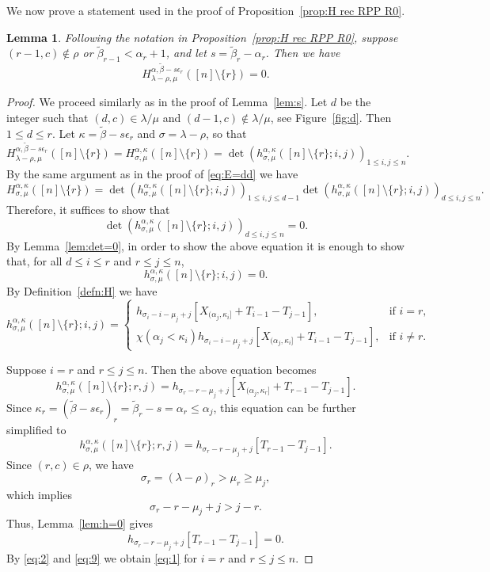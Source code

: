 \documentclass[12pt]{amsart}
\numberwithin{equation}{section}
\newtheorem{lem}[thm]{Lemma}
\theoremstyle{definition}
\newcommand\wb{\widetilde{\beta}}
\newcommand\lm{{\lambda/\mu}}
\begin{document}
We now prove a statement used in the proof of Proposition~\ref{prop:H rec RPP
  R0}.

\begin{lem}\label{lem:ss}
  Following the notation in Proposition~\ref{prop:H rec RPP R0}, suppose
  $(r-1,c)\notin\rho$ or $\wb_{r-1}<\alpha_r+1$, and let $s=\wb_r-\alpha_r$.
  Then we have
  \begin{equation}\label{eq:h0}
H^{\alpha,\wb-s\epsilon_r}_{\lambda-\rho,\mu}([n]\setminus\{r\})= 0.
  \end{equation}
\end{lem}
\begin{proof}
  We proceed similarly as in the proof of Lemma~\ref{lem:s}. Let $d$ be the
  integer such that $(d,c)\in\lm$ and $(d-1,c)\notin\lm$, see
  Figure~\ref{fig:d}. Then $1\le d\le r$. Let $\kappa=\wb-s\epsilon_r$ and
  $\sigma =\lambda-\rho$, so that
\[
H^{\alpha,\wb-s\epsilon_r}_{\lambda-\rho,\mu}([n]\setminus\{r\})
  = H_{\sigma,\mu}^{\alpha,\kappa}([n]\setminus\{r\})
=  \det(h_{\sigma,\mu}^{\alpha,\kappa}([n]\setminus\{r\};i,j))_{1\le i,j\le n}.
\]
By the same argument as in the proof of \eqref{eq:E=dd} we have
\[
  H_{\sigma,\mu}^{\alpha,\kappa}([n]\setminus\{r\})
  =  \det(h_{\sigma,\mu}^{\alpha,\kappa}([n]\setminus\{r\};i,j))_{1\le i,j\le d-1}
  \det(h_{\sigma,\mu}^{\alpha,\kappa}([n]\setminus\{r\};i,j))_{d\le i,j\le n}.
\]
Therefore, it suffices to show that
\[
\det(h_{\sigma,\mu}^{\alpha,\kappa}([n]\setminus\{r\};i,j))_{d\le i,j\le n} = 0.  
\]
By Lemma~\ref{lem:det=0}, in order to show the above equation it is enough to
show that, for all $d\le i\le r$ and $r\le j\le n$,
\begin{equation}
  \label{eq:1}
 h_{\sigma,\mu}^{\alpha,\kappa}([n]\setminus\{r\};i,j) = 0. 
\end{equation}
By Definition~\ref{defn:H} we have
    \[
      h^{\alpha,\kappa}_{\sigma,\mu}([n]\setminus\{r\};i,j)=
      \begin{cases}
      h_{\sigma_i-i-\mu_j+j}[X_{(\alpha_j,\kappa_i]} + T_{i-1}-T_{j-1}],
      & \mbox{if $i= r$},\\
      \chi(\alpha_j<\kappa_i) h_{\sigma_i-i-\mu_j+j}[X_{(\alpha_j,\kappa_i]} + T_{i-1}-T_{j-1}],
      & \mbox{if $i\ne r$}.
      \end{cases}
  \]

  Suppose $i=r$ and $r\le j\le n$. Then the above equation becomes
\[
      h^{\alpha,\kappa}_{\sigma,\mu}([n]\setminus\{r\};r,j)=
      h_{\sigma_r-r-\mu_j+j}[X_{(\alpha_j,\kappa_r]} + T_{r-1}-T_{j-1}].
\]
Since $\kappa_r = (\wb-s\epsilon_r)_r = \wb_r-s = \alpha_r \le \alpha_j$,
this equation can be further simplified to
\begin{equation}
  \label{eq:2}
      h^{\alpha,\kappa}_{\sigma,\mu}([n]\setminus\{r\};r,j)=
      h_{\sigma_r-r-\mu_j+j}[T_{r-1}-T_{j-1}].
\end{equation}
Since $(r,c)\in\rho$, we have
\[
\sigma_r=(\lambda-\rho)_r>\mu_r\ge\mu_j,
\]
which implies
\[
\sigma_r-r-\mu_j+j > j-r.
\]
Thus, Lemma~\ref{lem:h=0} gives
\begin{equation}
  \label{eq:9}
      h_{\sigma_r-r-\mu_j+j}[T_{r-1}-T_{j-1}]=0.
\end{equation}
By \eqref{eq:2} and \eqref{eq:9} we obtain \eqref{eq:1} for $i=r$ and $r\le j\le n$.


\end{proof}
\end{document}
